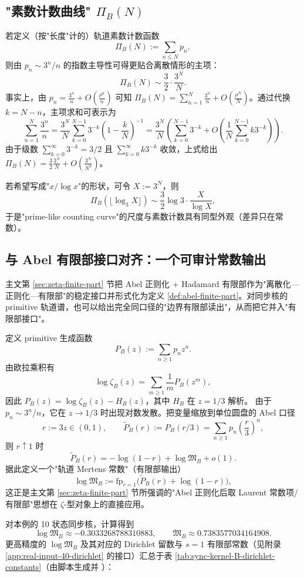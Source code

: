 \subsection{"素数计数曲线" \texorpdfstring{$\Pi_B(N)$}{Pi\_B(N)}}
若定义（按"长度"计的）轨道素数计数函数
\[
\Pi_B(N):=\sum_{n\le N}p_n,
\]
则由 $p_n\sim 3^n/n$ 的指数主导性可得更贴合离散情形的主项：
\[
\Pi_B(N)\sim \frac{3}{2}\cdot \frac{3^N}{N}.
\]
事实上，由 $p_n = \frac{3^n}{n} + O(\frac{\rho^n}{n})$ 可知 $\Pi_B(N) = \sum_{n=1}^N \frac{3^n}{n} + O(\frac{\rho^N}{N})$。通过代换 $k = N - n$，主项求和可表示为
\[
\sum_{n=1}^N \frac{3^n}{n} = \frac{3^N}{N} \sum_{k=0}^{N-1} 3^{-k} \left( 1 - \frac{k}{N} \right)^{-1} = \frac{3^N}{N} \left( \sum_{k=0}^{N-1} 3^{-k} + O\left(\frac{1}{N}\sum_{k=0}^{N-1} k 3^{-k}\right) \right).
\]
由于级数 $\sum_{k=0}^\infty 3^{-k} = 3/2$ 且 $\sum_{k=0}^\infty k 3^{-k}$ 收敛，上式给出 $\Pi_B(N) = \frac{3}{2} \frac{3^N}{N} + O\left(\frac{3^N}{N^2}\right)$。

若希望写成"$x/\log x$"的形状，可令 $X:=3^N$，则
\[
\Pi_B(\lfloor \log_3 X\rfloor)\sim \frac{3}{2}\log 3\cdot \frac{X}{\log X},
\]
于是"prime-like counting curve"的尺度与素数计数具有同型外观（差异只在常数）。

\subsection{与 Abel 有限部接口对齐：一个可审计常数输出}
主文第 \ref{sec:zeta-finite-part} 节把 Abel 正则化 + Hadamard 有限部作为"离散化—正则化—有限部"的稳定接口并形式化为定义 \ref{def:abel-finite-part}。对同步核的 primitive 轨道谱，也可以给出完全同口径的"边界有限部读出"，从而把它并入"有限部接口"。

定义 primitive 生成函数
\[
P_B(z):=\sum_{n\ge 1}p_n z^n.
\]
由欧拉乘积有
\[
\log\zeta_B(z)=\sum_{m\ge 1}\frac{1}{m}P_B(z^m),
\]
因此 $P_B(z)=\log\zeta_B(z)-H_B(z)$，其中 $H_B$ 在 $z=1/3$ 解析。
由于 $p_n\sim 3^n/n$，它在 $z\to 1/3$ 时出现对数发散。把变量缩放到单位圆盘的 Abel 口径
\[
r:=3z\in(0,1),\qquad
\widetilde P_B(r):=P_B(r/3)=\sum_{n\ge 1}p_n\left(\frac{r}{3}\right)^n,
\]
则 $r\uparrow 1$ 时
\[
\widetilde P_B(r)= -\log(1-r)+\log\mathfrak{M}_B+o(1).
\]
据此定义一个"轨道 Mertens 常数"（有限部输出）
\[
\log\mathfrak{M}_B
:=\mathrm{fp}_{r=1}\bigl(\widetilde P_B(r)+\log(1-r)\bigr),
\]
这正是主文第 \ref{sec:zeta-finite-part} 节所强调的"Abel 正则化后取 Laurent 常数项/有限部"思想在 $\zeta$-型对象上的直接应用。

对本例的 10 状态同步核，计算得到
\[
\log \mathfrak{M}_B\approx -0.3033268788310883,
\qquad
\mathfrak{M}_B\approx 0.7383577034164908.
\]
更高精度的 $\log\mathfrak{M}_B$ 及其对应的 Dirichlet 留数与 $s=1$ 有限部常数（见附录 \ref{app:real-input-40-dirichlet} 的接口）汇总于表 \ref{tab:sync-kernel-B-dirichlet-constants}（由脚本生成并 \verb||）：


